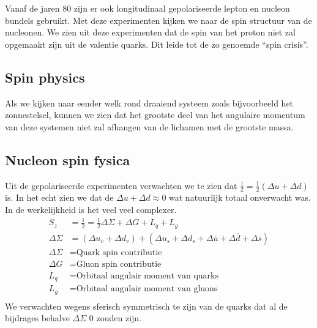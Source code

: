 \documentclass[../main.tex]{subfiles}
\begin{document}
Vanaf de jaren 80 zijn er ook longitudinaal gepolariseerde lepton en nucleon bundels gebruikt. Met deze experimenten kijken we naar de spin structuur van de nucleonen. We zien uit deze experimenten dat de spin van het proton niet zal opgemaakt zijn uit de valentie quarks. Dit leide tot de zo genoemde ``spin crisis''.

\subsection{Spin physics}%
\label{sub:spin_physics}

Als we kijken naar eender welk rond draaiend systeem zoals bijvoorbeeld het zonnestelsel, kunnen we zien dat het grootste deel van het angulaire momentum van deze systemen niet zal afhangen van de lichamen met de grootste massa.

\subsection{Nucleon spin fysica}%
\label{sub:nucleon_spin_fysica}

Uit de gepolariseerde experimenten verwachten we te zien dat $\frac{1}{2} = \frac{1}{2} (\Delta u + \Delta d)$ is. In het echt zien we dat de $\Delta u + \Delta d \approx 0$ wat natuurlijk totaal onverwacht was.\\
In de werkelijkheid is het veel veel complexer.
\begin{equation}
    \begin{aligned}
        \label{eq:spin_werkelijk}
        S_z &= \frac{1}{2} = \frac{1}{2} \Delta \Sigma + \Delta G + L_q + L_g\\
        \Delta \Sigma &= (\Delta u_v + \Delta d_v) + (\Delta u_s + \Delta d_s + \Delta \overline u+ \Delta \overline d+ \Delta \overline s)\\
        \Delta \Sigma &= \text{Quark spin contributie}\\
        \Delta G &= \text{Gluon spin contributie}\\
        L_q &= \text{Orbitaal angulair moment van quarks}\\
        L_g &= \text{Orbitaal angulair moment van gluons}\\
    \end{aligned}
\end{equation}
We verwachten wegens sferisch symmetrisch te zijn van de quarks dat al de bijdrages behalve $\Delta \Sigma$ 0 zouden zijn.\\
\end{document}
